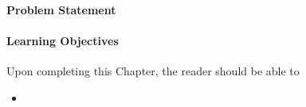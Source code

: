\paragraph{Problem Statement}
 

\paragraph{Learning Objectives}
Upon completing this Chapter, the reader should be able to
\begin{itemize}
  \item 
\end{itemize}